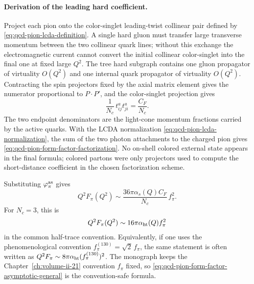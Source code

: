 \paragraph{Derivation of the leading hard coefficient.}
Project each pion onto the color-singlet leading-twist collinear pair defined
by \eqref{eq:qcd-pion-lcda-definition}.  A single hard gluon must transfer
large transverse momentum between the two collinear quark lines; without this
exchange the electromagnetic current cannot convert the initial collinear
color-singlet into the final one at fixed large \(Q^2\).  The tree hard
subgraph contains one gluon propagator of virtuality \(O(Q^2)\) and one
internal quark propagator of virtuality \(O(Q^2)\).  Contracting the spin
projectors fixed by the axial matrix element gives the numerator
proportional to \(P\cdot P'\), and the color-singlet projection gives
\[
  \frac1{N_c}\,t^a_{ij}t^a_{ji}
  =
  \frac{C_F}{N_c}.
\]
The two endpoint denominators are the light-cone momentum fractions carried by
the active quarks.  With the LCDA normalization
\eqref{eq:qcd-pion-lcda-normalization}, the sum of the two photon attachments
to the charged pion gives
\eqref{eq:qcd-pion-form-factor-factorization}.  No on-shell colored external
state appears in the final formula; colored partons were only projectors used
to compute the short-distance coefficient in the chosen factorization scheme.

Substituting \(\varphi_\pi^{\rm as}\) gives
\begin{equation}
  Q^2F_\pi(Q^2)
  \sim
  \frac{36\pi\alpha_s(Q)C_F}{N_c}\,f_\pi^2 .
  \label{eq:qcd-pion-form-factor-asymptotic-general}
\end{equation}
For \(N_c=3\), this is
\[
  Q^2F_\pi(Q^2)\sim 16\pi\alpha_{\rm ht}(Q) f_\pi^2
\]
in the common half-trace convention.  Equivalently, if one uses the
phenomenological convention \(f_\pi^{(130)}=\sqrt2\,f_\pi\), the same statement
is often written as \(Q^2F_\pi\sim
8\pi\alpha_{\rm ht}(f_\pi^{(130)})^2\).  The monograph keeps the
Chapter~\ref{ch:volume-ii-21} convention \(f_\pi\) fixed, so
\eqref{eq:qcd-pion-form-factor-asymptotic-general} is the convention-safe
formula.

